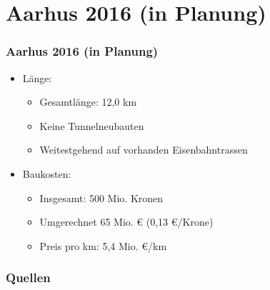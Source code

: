 \documentclass{beamer}
\begin{document}

\section{Aarhus 2016 (in Planung)}
\begin{frame}
  \frametitle{Aarhus 2016 (in Planung)}

  \begin{itemize}
    \item Länge:
      \begin{itemize}
        \item Gesamtlänge: 12,0 km
        \item Keine Tunnelneubauten
        \item Weitestgehend auf vorhanden Eisenbahntrassen
      \end{itemize}
    \item Baukosten:
      \begin{itemize}
        \item Insgesamt: 500 Mio. Kronen
        \item Umgerechnet 65 Mio. € (0,13 €/Krone)
        \item Preis pro km: 5,4 Mio. €/km
      \end{itemize}
  \end{itemize}
\end{frame}


\begin{frame}[allowframebreaks]
  \frametitle{Quellen}

  \nocite{UmrechnungGoldmark}
  \nocite{buernheim1997bahnen}
  \nocite{hoeltge1992hessen}
  \nocite{BybaneBergen}
  \nocite{BergenCurrentStatus}
  \nocite{midttrafik}
  \nocite{UmrechnungKronen}

  \begin{scriptsize}
    
  \end{scriptsize}
\end{frame}

\end{document}
